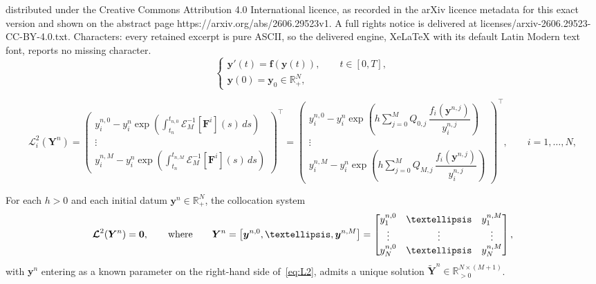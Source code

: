 \documentclass[10pt,a4paper]{amsart}
\begin{document}
distributed under the Creative Commons Attribution 4.0 International licence, as recorded in the arXiv licence metadata for this exact version and shown on the abstract page https://arxiv.org/abs/2606.29523v1. A full rights notice is delivered at licenses/arxiv-2606.29523-CC-BY-4.0.txt. Characters: every retained excerpt is pure ASCII, so the delivered engine, XeLaTeX with its default Latin Modern text font, reports no missing character.
\begin{equation}\label{eq:ODE_system}
\begin{cases}
    \bm{y}'(t) = \bm{f}(\bm{y}(t)), \qquad  t \in [0,T],\\
    \bm{y}(0) = \bm{y}_0 \in \mathbb{R}_{+}^{N},
\end{cases}
\end{equation}

\begin{equation}\label{eq:L2}
    \mathcal{L}_i^2(\bm{Y}^{n})=\begin{pmatrix}
        y_i^{n,0}-y_i^{n}\exp\!\left(\displaystyle\int_{t_n}^{t_{n,0}} \mathcal{E}_M^{-1}[\bm{F}^i](s) \, ds \right) \\
        \vdots \\
        y_i^{n,M}-y_i^{n}\exp\!\left(\displaystyle\int_{t_n}^{t_{n,M}} \mathcal{E}_M^{-1}[\bm{F}^i](s) \, ds \right)
    \end{pmatrix}^\top=\begin{pmatrix}
        y_i^{n,0}-y_i^{n}\exp\!\left( h \sum_{j=0}^{M} Q_{0,j} \, \dfrac{f_i(\bm y^{n,j})}{y_i^{n,j}} \right) \\
        \vdots \\
        y_i^{n,M}-y_i^{n}\exp\!\left( h \sum_{j=0}^{M} Q_{M,j}\, \dfrac{f_i(\bm y^{n,j})}{y_i^{n,j}} \right)
    \end{pmatrix}^\top, \quad \quad i=1,\dots,N,
\end{equation}

\begin{assumption}
\label{ass:Solv}
     For each $h>0$ and each initial datum $\bm{y}^n\in\mathbb{R}_{+}^{N}$, the collocation system
    \begin{equation}\label{eq:coll_syst_Con_L}
            \bm{\mathcal{L}}^2(\bm{Y}^n)=\bm{0},   \\
        \qquad \text{where} \qquad \bm{Y}^{n} =
        \big[ \bm{y}^{n,0},\dots,\bm{y}^{n,M} \big]=\begin{bmatrix}
        y_1^{n,0} & \dots & y_1^{n,M} \\
        \vdots & \vdots  & \vdots \\
        y_N^{n,0} & \dots & y_N^{n,M} \\ 
        \end{bmatrix},
    \end{equation}
    with $\bm{y}^n$ entering as a known parameter on the 
    right-hand side of~\eqref{eq:L2}, admits a unique 
    solution $\tilde{\bm{Y}}^n\in\mathbb{R}^{N\times(M+1)}_{>0}$.
\end{assumption}
\end{document}
